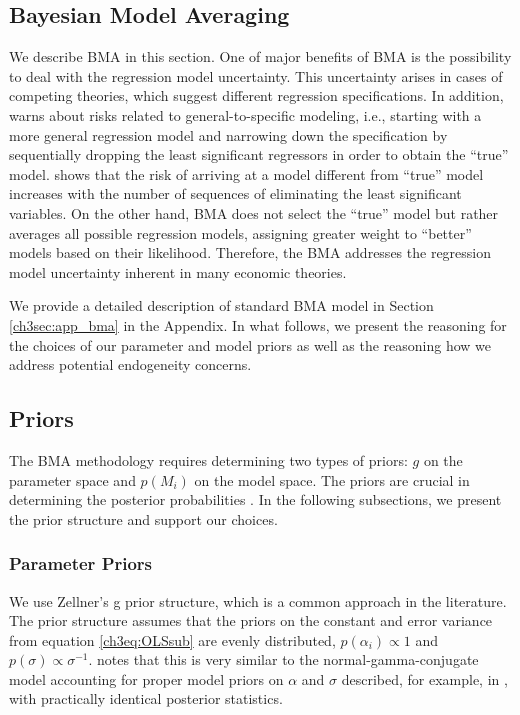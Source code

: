 \begin{refsection}
\section{Bayesian Model Averaging}
\label{ch3sec:BMA}
We describe \ac{BMA} in this section. %
One of major benefits of \ac{BMA} is the possibility to deal with the regression model uncertainty. This uncertainty arises in cases of competing theories, which suggest different regression specifications. In addition, \textcite{Koop2003} warns about risks related to general-to-specific modeling, i.e., starting with a more general regression model and narrowing down the specification by sequentially dropping the least significant regressors in order to obtain the ``true'' model. \textcite{Koop2003} shows that the risk of arriving at a model different from ``true'' model increases with the number of sequences of eliminating the least significant variables. On the other hand, BMA does not select the ``true'' model but rather averages all possible regression models, assigning greater weight to ``better'' models based on their likelihood. Therefore, the \ac{BMA} addresses the regression model uncertainty inherent in many economic theories. 

We provide a detailed description of standard BMA model in Section \ref{ch3sec:app_bma} in the Appendix. In what follows, we present the reasoning for the choices of our parameter and model priors as well as the reasoning how we address potential endogeneity concerns. 

\subsection*{Priors}
\label{ch3sec:priors}
The \ac{BMA} methodology requires determining two types of priors: $g$ on the parameter space and $p(M_{i})$ on the model space. The priors are crucial in determining the posterior probabilities \parencite{FeldkircherZeugner2009,CicconeJarocinski2010,Liangetal2008}. In the following subsections, we present the prior structure and support our choices.

\subsubsection*{Parameter Priors}
We use Zellner's g prior structure, which is a common approach in the literature. The prior structure assumes that the priors on the constant and error variance from equation \ref{ch3eq:OLSsub} are evenly distributed, $p(\alpha_{i}) \propto 1$ and $p(\sigma) \propto \sigma^{-1}$. \textcite{Zeugner2011} notes that this is very similar to the normal-gamma-conjugate model accounting for proper model priors on $\alpha$ and $\sigma$ described, for example, in \textcite{Koop2003}, with practically identical posterior statistics. 


\end{refsection}
